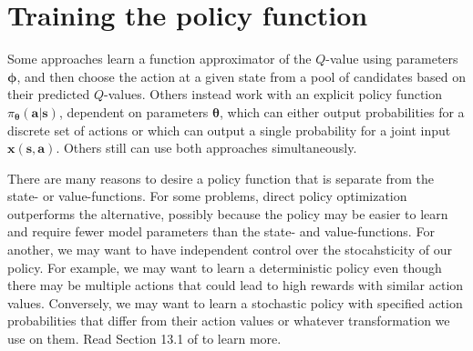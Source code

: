 \documentclass{article}
\begin{document}
\section{Training the policy function}

Some approaches learn a function approximator of the $Q$-value using parameters $\boldsymbol{\phi}$, and then choose the action at a given state from a pool of candidates based on their predicted $Q$-values. Others instead work with an explicit policy function $\pi_{\boldsymbol{\theta}}(\mathbf{a}|\mathbf{s})$, dependent on parameters $\boldsymbol{\theta}$, which can either output probabilities for a discrete set of actions or which can output a single probability for a joint input $\mathbf{x}(\mathbf{s}, \mathbf{a})$. Others still can use both approaches simultaneously.

There are many reasons to desire a policy function that is separate from the state- or value-functions. For some problems, direct policy optimization outperforms the alternative, possibly because the policy may be easier to learn and require fewer model parameters than the state- and value-functions. For another, we may want to have independent control over the stocahsticity of our policy. For example, we may want to learn a deterministic policy even though there may be multiple actions that could lead to high rewards with similar action values. Conversely, we may want to learn a stochastic policy with specified action probabilities that differ from their action values or whatever transformation we use on them.  Read Section 13.1 of \cite{sutton_barto_rl} to learn more.
\end{document}
